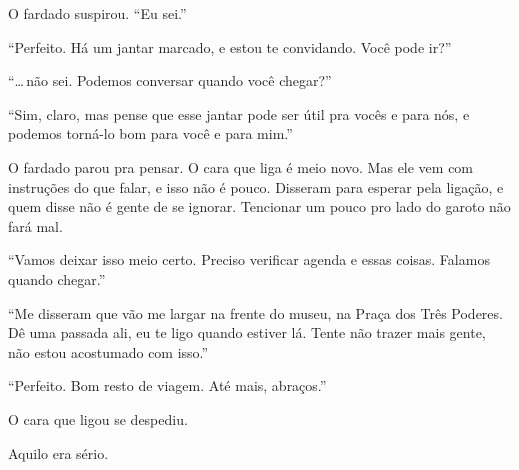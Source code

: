 O fardado suspirou. ``Eu sei.''

``Perfeito. Há um jantar marcado, e estou te convidando. Você pode ir?''

``\ldots\,não sei. Podemos conversar quando você chegar?''

``Sim, claro, mas pense que esse jantar pode ser útil pra vocês e para nós, e podemos torná-lo bom para você e para mim.''

O fardado parou pra pensar. O cara que liga é meio novo. Mas ele vem com instruções do que falar, e isso não é pouco. Disseram para esperar pela ligação, e quem disse não é gente de se ignorar. Tencionar um pouco pro lado do garoto não fará mal.

``Vamos deixar isso meio certo. Preciso verificar agenda e essas coisas. Falamos quando chegar.''

``Me disseram que vão me largar na frente do museu, na Praça dos Três Poderes. Dê uma passada ali, eu te ligo quando estiver lá. Tente não trazer mais gente, não estou acostumado com isso.''

``Perfeito. Bom resto de viagem. Até mais, abraços.''

O cara que ligou se despediu.

Aquilo era sério.
